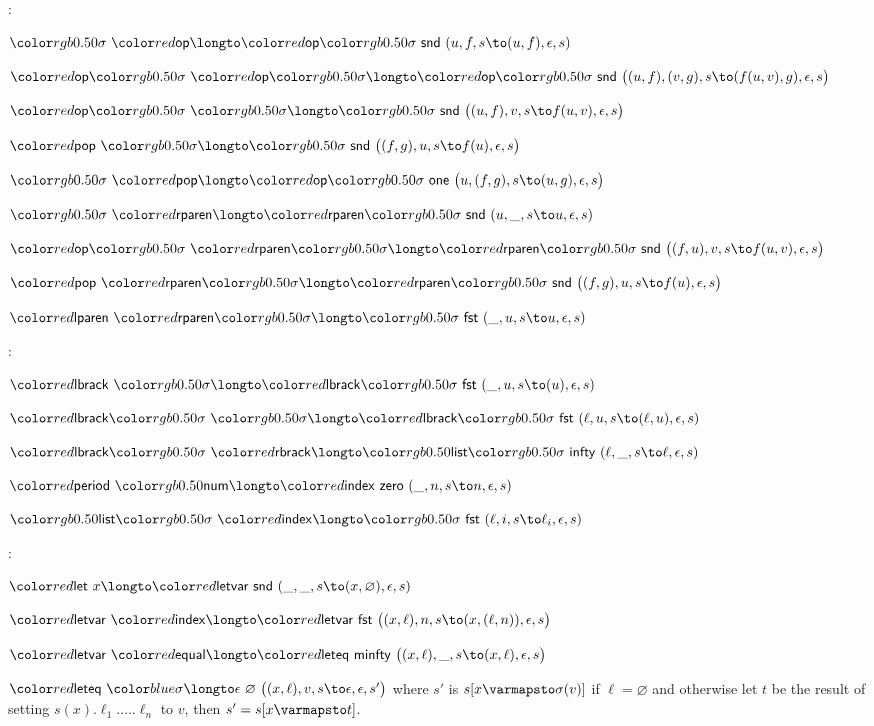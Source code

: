 :
\blist
    \item $\tsig\ \op \longto \op\tsig\ \snd\ (u,f,s\to(u,f),\epsilon,s)$
    \item $\op\tsig\ \op\tsig \longto \op\tsig\ \snd\ \bigl((u,f),(v,g),s\to (f(u,v),g),\epsilon,s\bigr)$
    \item $\op\tsig\ \tsig \longto \tsig\ \snd\ \bigl((u,f),v,s\to f(u,v),\epsilon,s\bigr)$
    \item $\Pop\ \tsig \longto \tsig\ \snd\ \bigl((f,g),u,s\to f(u),\epsilon,s\bigr)$
    \item $\tsig\ \Pop \longto \op\tsig\ {\sf one}\ \bigl(u,(f,g),s\to(u,g),\epsilon,s\bigr)$
    \item $\tsig\ \rparen \longto \rparen\tsig\ \snd\ (u,\_,s\to u,\epsilon,s)$
    \item $\op\tsig\ \rparen\tsig \longto \rparen\tsig\ \snd\ \bigl((f,u),v,s\to f(u,v),\epsilon,s\bigr)$
    \item $\Pop\ \rparen\tsig \longto \rparen\tsig\ \snd\ \bigl((f,g),u,s\to f(u),\epsilon,s\bigr)$
    \item $\lparen\ \rparen\tsig \longto \tsig\ \fst\ (\_,u,s\to u,\epsilon,s)$
\elist

:
\blist
    \item $\lbrack\ \tsig \longto \lbrack\tsig\ \fst\ (\_,u,s\to (u),\epsilon,s)$
    \item $\lbrack\tsig\ \tsig \longto \lbrack\tsig\ \fst\ (\ell,u,s\to (\ell,u),\epsilon,s)$
    \item $\lbrack\tsig\ \rbrack \longto \list\tsig\ \pinfty\ (\ell,\_,s\to\ell,\epsilon,s)$
    \item $\period\ \num \longto \index\ \zero\ (\_,n,s\to n,\epsilon,s)$
    \item $\list\tsig\ \index \longto \tsig\ \fst\ (\ell,i,s\to \ell_i,\epsilon,s)$
\elist

:
\blist
    \item $\lett\ x \longto \letvar\ \snd\ (\_,\_,s\to(x,\varnothing),\epsilon,s)$
    \item $\letvar\ \index \longto \letvar\ \fst\ \bigl((x,\ell),n,s\to(x,(\ell,n)),\epsilon,s\bigr)$
    \item $\letvar\ \equal \longto \leteq\ \minfty\ \bigl((x,\ell),\_,s\to(x,\ell),\epsilon,s\bigr)$
    \item $\leteq\ \isig \longto \epsilon\ \varnothing\ \bigl((x,\ell),v,s\to\epsilon,\epsilon,s'\bigr)$ where $s'$ is $s[x\varmapsto\sigma(v)]$ if $\ell=\varnothing$ and otherwise let $t$ be the result of
        setting $s(x).\ell_1.\dots.\ell_n$ to $v$, then $s'=s[x\varmapsto t]$.
\elist

